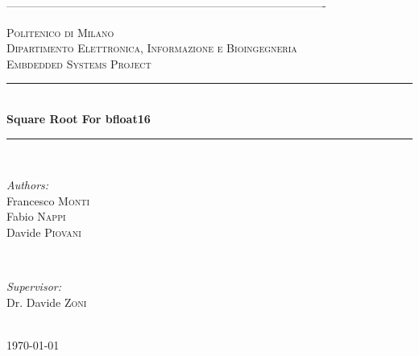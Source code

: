 \documentclass[12pt]{article}
\begin{document}
\begin{titlepage}

\newcommand{\HRule}{\rule{\linewidth}{0.5mm}} 

\center
-------------------------------------------------------------------------------------

\textsc{\LARGE Politenico di Milano}\\[1cm]
\textsc{\Large Dipartimento Elettronica, Informazione e Bioingegneria}\\[0.5cm] 
\textsc{\large Embdedded Systems Project}\\[0.5cm] 


\HRule \\[0.4cm]
{ \huge \bfseries Square Root For bfloat16}\\[0.4cm]
\HRule \\[1.5cm]
 

\begin{minipage}{0.4\textwidth}
	\begin{flushleft} \large
		\emph{Authors:}\\
		Francesco \textsc{Monti} \\
		Fabio \textsc{Nappi} \\
		Davide \textsc{Piovani} 
	\end{flushleft}
\end{minipage}
~
\begin{minipage}{0.4\textwidth}
	\begin{flushright} \large
		\emph{Supervisor:} \\
		Dr. Davide \textsc{Zoni}
	\end{flushright}
\end{minipage}\\[1.5cm]



{\large \today}\\[2cm] 


\end{titlepage}
\end{document}

